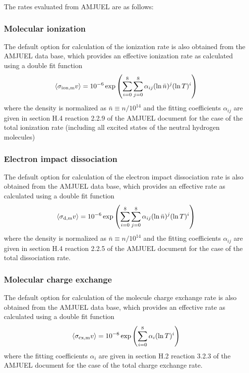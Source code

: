 \documentclass[amsmath,amssymb,a4]{revtex4-2}
\begin{document}
The rates evaluated from AMJUEL are as follows:
\subsubsection*{Molecular ionization}
The default option for calculation of the ionization rate is also obtained from the AMJUEL data base, which provides an effective ionization rate as calculated using a double fit function
\begin{equation}\label{ionization_AMJUEL}
    \langle\sigma_{\rm ion,m} v\rangle = 10^{-6} \exp\left( \sum_{i=0}^8\sum_{j=0}^8 \alpha_{ij} (\ln \bar n)^j (\ln T)^i \right) %
\end{equation}
where the density is normalized as $\bar n \equiv n / 10^{14}$ and the fitting coefficients $\alpha_{ij}$ are given in section H.4 reaction 2.2.9 of the AMJUEL document for the case of the total ionization rate (including all excited states of the neutral hydrogen molecules)

\subsubsection*{Electron impact dissociation}
The default option for calculation of the electron impact dissociation rate is also obtained from the AMJUEL data base, which provides an effective rate as calculated using a double fit function
\begin{equation}\label{ionization_AMJUEL}
    \langle\sigma_{\rm d,m} v\rangle = 10^{-6} \exp\left( \sum_{i=0}^8\sum_{j=0}^8 \alpha_{ij} (\ln \bar n)^j (\ln T)^i \right) %
\end{equation}
where the density is normalized as $\bar n \equiv n / 10^{14}$ and the fitting coefficients $\alpha_{ij}$ are given in section H.4 reaction 2.2.5 of the AMJUEL document for the case of the total dissociation rate.

\subsubsection*{Molecular charge exchange}
The default option for calculation of the molecule charge exchange rate is also obtained from the AMJUEL data base, which provides an effective rate as calculated using a double fit function
\begin{equation}\label{molecular_charge_exchange}
    \langle\sigma_{\rm cx,m} v\rangle = 10^{-6} \exp\left( \sum_{i=0}^8 \alpha_{i}  (\ln T)^i \right)  %
\end{equation}
where the fitting coefficients $\alpha_{i}$ are given in section {H.2} reaction {3.2.3} of the AMJUEL document for the case of the total charge exchange rate.
\end{document}

